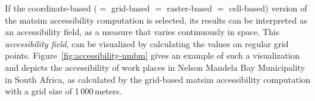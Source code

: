 %
%
%

If the coordinate-based ($=$ grid-based $=$ raster-based $=$ cell-based) version of the \gls{matsim} accessibility
computation is selected, its results can be interpreted as an accessibility field, \ie as a measure
that varies continuously in space. This \emph{accessibility field}, can be visualized by calculating
the values on regular grid points. Figure~\ref{fig:accessibility-nmbm} gives an example of such a
visualization and depicts the accessibility of work places in Nelson Mandela Bay Municipality in South
Africa, as calculated by the grid-based \gls{matsim} accessibility computation with a grid size 
of 1\,000\,meters.

